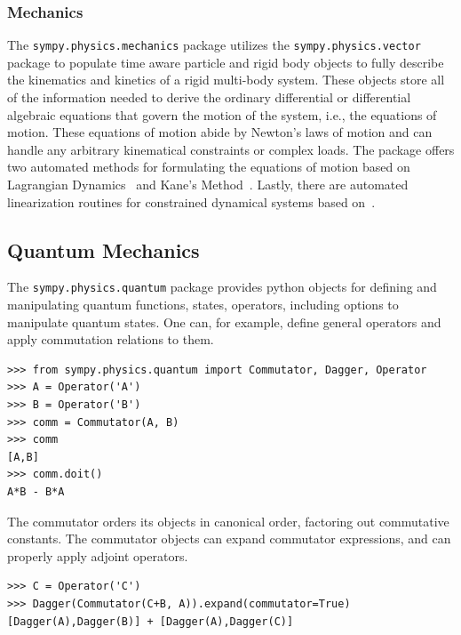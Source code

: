\subsubsection{Mechanics}

The \verb|sympy.physics.mechanics| package utilizes the \texttt{sympy.\allowbreak{}physics.\allowbreak{}vector} package
to populate time aware particle and rigid body objects to fully describe the
kinematics and kinetics of a rigid multi-body system. These objects store all
of the information needed to derive the ordinary differential or differential
algebraic equations that govern the motion of the system, i.e., the equations
of motion. These equations of motion abide by Newton's laws of motion and can
handle any arbitrary kinematical constraints or complex loads. The package
offers two automated methods for formulating the equations of motion based on
Lagrangian Dynamics~\cite{Lagrange1811} and Kane's Method~\cite{Kane1985}. Lastly, there
are automated linearization routines for constrained dynamical
systems based on~\cite{Peterson2014}.

\subsection{Quantum Mechanics}

The \verb|sympy.physics.quantum| package provides python objects for defining and manipulating quantum functions, states, operators, including options to manipulate quantum states. One can, for example, define general operators and apply commutation relations to them.
\begin{verbatim}
>>> from sympy.physics.quantum import Commutator, Dagger, Operator
>>> A = Operator('A')
>>> B = Operator('B')
>>> comm = Commutator(A, B)
>>> comm
[A,B]
>>> comm.doit()
A*B - B*A
\end{verbatim}
The commutator orders its objects in canonical order, factoring out commutative constants. The commutator objects can expand commutator expressions, and can properly apply adjoint operators.
\begin{verbatim}
>>> C = Operator('C')
>>> Dagger(Commutator(C+B, A)).expand(commutator=True)
[Dagger(A),Dagger(B)] + [Dagger(A),Dagger(C)]
\end{verbatim}

